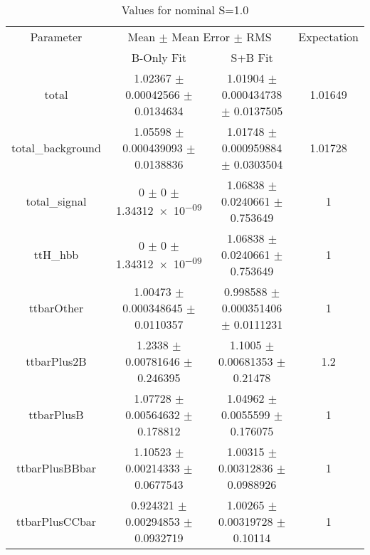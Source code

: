 \begin{table}
\centering
\caption{Values for nominal S=1.0}
\begin{tabular}{cccc}
\toprule
Parameter & \multicolumn{2}{c}{Mean $\pm$ Mean Error $\pm$ RMS} & Expectation\\
 & B-Only Fit & S+B Fit & \\
\midrule
total & \num{1.02367} $\pm$ \num{0.00042566} $\pm$ \num{0.0134634} & \num{1.01904} $\pm$ \num{0.000434738} $\pm$ \num{0.0137505} & \num{1.01649}\\
total\_background & \num{1.05598} $\pm$ \num{0.000439093} $\pm$ \num{0.0138836} & \num{1.01748} $\pm$ \num{0.000959884} $\pm$ \num{0.0303504} & \num{1.01728}\\
total\_signal & \num{0} $\pm$ \num{0} $\pm$ \num{1.34312e-09} & \num{1.06838} $\pm$ \num{0.0240661} $\pm$ \num{0.753649} & \num{1}\\
ttH\_hbb & \num{0} $\pm$ \num{0} $\pm$ \num{1.34312e-09} & \num{1.06838} $\pm$ \num{0.0240661} $\pm$ \num{0.753649} & \num{1}\\
ttbarOther & \num{1.00473} $\pm$ \num{0.000348645} $\pm$ \num{0.0110357} & \num{0.998588} $\pm$ \num{0.000351406} $\pm$ \num{0.0111231} & \num{1}\\
ttbarPlus2B & \num{1.2338} $\pm$ \num{0.00781646} $\pm$ \num{0.246395} & \num{1.1005} $\pm$ \num{0.00681353} $\pm$ \num{0.21478} & \num{1.2}\\
ttbarPlusB & \num{1.07728} $\pm$ \num{0.00564632} $\pm$ \num{0.178812} & \num{1.04962} $\pm$ \num{0.0055599} $\pm$ \num{0.176075} & \num{1}\\
ttbarPlusBBbar & \num{1.10523} $\pm$ \num{0.00214333} $\pm$ \num{0.0677543} & \num{1.00315} $\pm$ \num{0.00312836} $\pm$ \num{0.0988926} & \num{1}\\
ttbarPlusCCbar & \num{0.924321} $\pm$ \num{0.00294853} $\pm$ \num{0.0932719} & \num{1.00265} $\pm$ \num{0.00319728} $\pm$ \num{0.10114} & \num{1}\\
\bottomrule
\end{tabular}
\end{table}
